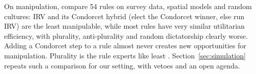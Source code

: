 On manipulation, \citet{GreenArmytageTidemanCosman2016} compare 54 rules on survey data, spatial models
and random cultures: IRV and its Condorcet hybrid (elect the Condorcet winner, else run IRV) are the
least manipulable, while most rules have very similar utilitarian efficiency, with plurality,
anti-plurality and random dictatorship clearly worse. Adding a Condorcet step to a rule almost never
creates new opportunities for manipulation. Plurality is the rule experts like least \citep{Laslier2012loser}.
Section~\ref{sec:simulation} repeats such a comparison for our setting, with vetoes and an open agenda.
